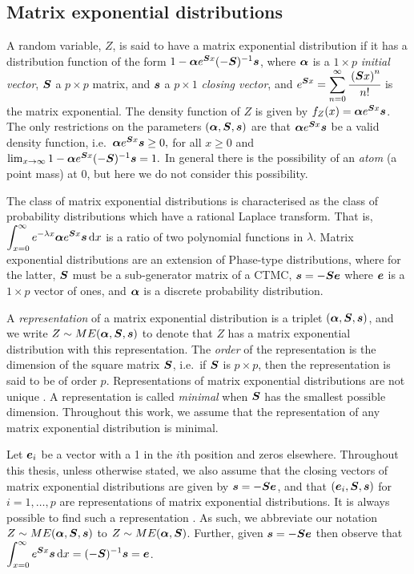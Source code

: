\subsection{Matrix exponential distributions}
A random variable, \(Z\), is said to have a matrix exponential distribution if it has a distribution function of the form \(1-\boldsymbol \alpha e^{\boldsymbol Sx}(-\boldsymbol S)^{-1}\boldsymbol s\), where \(\boldsymbol \alpha\) is a \(1\times p\) \emph{initial vector}, \(\boldsymbol S\) a \(p\times p\) matrix, and \(\boldsymbol s\) a \(p\times 1\) \emph{closing vector}, and \(\displaystyle e^{\boldsymbol S x} = \sum_{n=0}^\infty \cfrac{\left(\boldsymbol Sx\right)^n}{n!}\) is the matrix exponential. The density function of \(Z\) is given by \(f_Z(x) = \boldsymbol\alpha e^{\boldsymbol S x}\boldsymbol s\). The only restrictions on the parameters \((\boldsymbol \alpha, \boldsymbol S, \boldsymbol s)\) are that \(\boldsymbol \alpha e^{\boldsymbol S x} \boldsymbol s\) be a valid density function, i.e.~\(\boldsymbol \alpha e^{\boldsymbol S x} \boldsymbol s\geq 0,\) for all \(x\geq 0\) and \(\lim_{x\to\infty} 1-\boldsymbol \alpha e^{\boldsymbol Sx}(-\boldsymbol S)^{-1}\boldsymbol s = 1.\) In general there is the possibility of an \emph{atom} (a point mass) at 0, but here we do not consider this possibility. 

The class of matrix exponential distributions is characterised as the class of probability distributions which have a rational Laplace transform. That is, \(\displaystyle \int_{x=0}^\infty e^{-\lambda x}\boldsymbol \alpha e^{\boldsymbol S x}\boldsymbol s \, \mathrm{d} x\) is a ratio of two polynomial functions in \(\lambda\). Matrix exponential distributions are an extension of Phase-type distributions, where for the latter, \(\boldsymbol S\) must be a sub-generator matrix of a CTMC, \(\boldsymbol s = -\boldsymbol S\boldsymbol e\) where \(\boldsymbol e\) is a \(1\times p\) vector of ones, and \(\boldsymbol \alpha\) is a discrete probability distribution.  

A \emph{representation} of a matrix exponential distribution is a triplet \((\boldsymbol \alpha, \boldsymbol S, \boldsymbol s)\), and we write \(Z\sim ME(\boldsymbol \alpha, \boldsymbol S, \boldsymbol s)\) to denote that \(Z\) has a matrix exponential distribution with this representation. The \emph{order} of the representation is the dimension of the square matrix \(\boldsymbol S\), i.e.~if \(\boldsymbol S\) is \(p\times p\), then the representation is said to be of order \(p\). Representations of matrix exponential distributions are not unique \citep{MEinAP}. A representation is called \emph{minimal} when \(\boldsymbol S\) has the smallest possible dimension. Throughout this work, we assume that the representation of any matrix exponential distribution is minimal. 

Let \(\boldsymbol e_i\) be a vector with a 1 in the \(i\)th position and zeros elsewhere. Throughout this thesis, unless otherwise stated, we also assume that the closing vectors of matrix exponential distributions are given by \(\boldsymbol s = -\boldsymbol S\boldsymbol e\), and that \((\boldsymbol e_i,\boldsymbol S,\boldsymbol s)\) for \(i=1,\dots,p\) are representations of matrix exponential distributions. It is always possible to find such a representation \cite[Theorem 4.5.17, Corollary 4.5.18]{MEinAP}. As such, we abbreviate our notation \(Z\sim ME(\boldsymbol \alpha, \boldsymbol S, \boldsymbol s)\) to \(Z\sim ME(\boldsymbol \alpha, \boldsymbol S)\). Further, given \(\boldsymbol s=-\boldsymbol S\boldsymbol e\) then observe that  \(\displaystyle \int_{x=0}^\infty e^{\boldsymbol S x} \boldsymbol s\, \mathrm{d} x = (-\boldsymbol S)^{-1}\boldsymbol s= \boldsymbol e\). 


